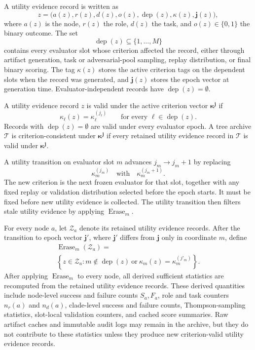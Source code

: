 A utility evidence record is written as
\[
z
=
\bigl(a(z),r(z),d(z),o(z),\operatorname{dep}(z),\kappa(z),\boldsymbol{j}(z)\bigr),
\]
where \(a(z)\) is the node, \(r(z)\) the role, \(d(z)\) the task, and \(o(z)\in\{0,1\}\) the binary
outcome. The set
\[
\operatorname{dep}(z)\subseteq\{1,\ldots,M\}
\]
contains every evaluator slot whose criterion affected the record, either through artifact generation,
task or adversarial-pool sampling, replay distribution, or final binary scoring. The tag \(\kappa(z)\) stores
the active criterion tags on the dependent slots when the record was generated, and \(\boldsymbol{j}(z)\)
stores the epoch vector at generation time. Evaluator-independent records have
\(\operatorname{dep}(z)=\emptyset\).

\begin{definition}
\label{def:criterion-valid-record}
A utility evidence record \(z\) is valid under the active criterion vector
\(\boldsymbol{\kappa}^{\boldsymbol{j}}\) if
\[
\kappa_\ell(z)=\kappa_\ell^{(j_\ell)}
\qquad
\text{for every } \ell\in\operatorname{dep}(z).
\]
Records with \(\operatorname{dep}(z)=\emptyset\) are valid under every evaluator epoch.
A tree archive \(\mathcal T\) is criterion-consistent under
\(\boldsymbol{\kappa}^{\boldsymbol{j}}\) if every retained utility evidence record in
\(\mathcal T\) is valid under \(\boldsymbol{\kappa}^{\boldsymbol{j}}\).
\end{definition}

\begin{definition}
\label{def:utility-transition}
A utility transition on evaluator slot \(m\) advances \(j_m\to j_m+1\) by replacing
\[
\kappa_m^{(j_m)}
\quad\text{with}\quad
\kappa_m^{(j_m+1)}.
\]
The new criterion is the next frozen evaluator for that slot, together with any fixed replay or
validation distribution selected before the epoch starts. It must be fixed before new utility evidence
is collected. The utility transition then filters stale utility evidence by applying
\(\operatorname{Erase}_m\).

For every node \(a\), let \(\mathcal Z_a\) denote its retained utility evidence records. After the
transition to epoch vector \(\boldsymbol{j}'\), where \(\boldsymbol{j}'\) differs from \(\boldsymbol{j}\) only in
coordinate \(m\), define
\[
\begin{gathered}
\operatorname{Erase}_m(\mathcal Z_a)
=\\
\left\{
z\in\mathcal Z_a:
m\notin\operatorname{dep}(z)
\ \text{or}\
\kappa_m(z)=\kappa_m^{(j'_m)}
\right\}.
\end{gathered}
\]
After applying \(\operatorname{Erase}_m\) to every node, all derived sufficient statistics are recomputed
from the retained utility evidence records. These derived quantities include node-level success and
failure counts \(S_a,F_a\), role and task counters \(n_r(a)\) and \(n_d(a)\), clade-level success
and failure counts, Thompson-sampling statistics, slot-local validation counters, and cached score
summaries. Raw artifact caches and immutable audit logs may remain in the archive, but they do not
contribute to these statistics unless they produce new criterion-valid utility evidence records.
\end{definition}

